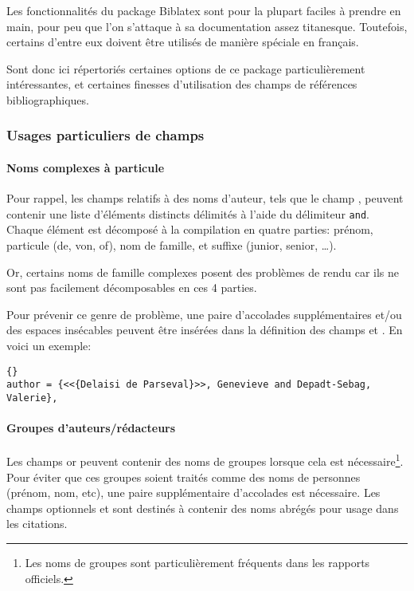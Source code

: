\documentclass{ltxdockit}
\newcommand*{\biblatex}{Biblatex\xspace}
\begin{document}
Les fonctionnalités du package \biblatex sont pour la plupart faciles à prendre en main, pour peu que l'on s'attaque à sa documentation assez titanesque. Toutefois, certains d'entre eux doivent être utilisés de manière spéciale en français.

Sont donc ici répertoriés certaines options de ce package particulièrement intéressantes, et certaines finesses d'utilisation des champs de références bibliographiques.

\subsubsection{Usages particuliers de champs}

\paragraph{Noms complexes à particule}

Pour rappel, les champs relatifs à des noms d'auteur, tels que le champ , peuvent contenir une liste d'éléments distincts délimités à l'aide du délimiteur \texttt{and}. Chaque élément est décomposé à la compilation en quatre parties: prénom, particule (de, von, of), nom de famille, et suffixe (junior, senior, \dots).

Or, certains noms de famille complexes posent des problèmes de rendu car ils ne sont pas facilement décomposables en ces 4 parties.

Pour prévenir ce genre de problème, une paire d'accolades supplémentaires et/ou des espaces insécables peuvent être insérées dans la définition des champs  et . En voici un exemple:

\begin{lstlisting}[style=bibtex]{}
author = {<<{Delaisi de Parseval}>>, Genevieve and Depadt-Sebag, Valerie},
\end{lstlisting}

\paragraph{Groupes d'auteurs/rédacteurs}

Les champs  or  peuvent contenir des noms de groupes lorsque cela est nécessaire\footnote{Les noms de groupes sont particulièrement fréquents dans les rapports officiels.}. Pour éviter que ces groupes soient traités comme des noms de personnes (prénom, nom, etc), une paire supplémentaire d'accolades est nécessaire. Les champs optionnels  et  sont destinés à contenir des noms abrégés pour usage dans les citations.
\end{document}
